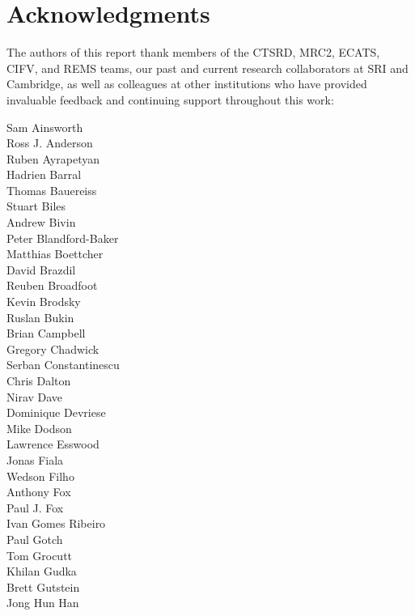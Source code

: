 \section*{Acknowledgments}

\vspace{-0.2cm}

The authors of this report thank members of the CTSRD, MRC2, ECATS,
CIFV, and REMS teams, our past and current research collaborators at SRI and
Cambridge, as well as colleagues at other institutions who have provided
invaluable feedback and continuing support throughout this work:

\medskip

\begin{small}
\noindent\begin{autogrid}{4}
Sam Ainsworth \\
Ross J. Anderson \\
Ruben Ayrapetyan \\
Hadrien Barral \\
Thomas Bauereiss \\
Stuart Biles \\
Andrew Bivin \\
Peter Blandford-Baker \\
Matthias Boettcher \\
David Brazdil \\
Reuben Broadfoot \\
Kevin Brodsky \\
Ruslan Bukin \\
Brian Campbell \\
Gregory Chadwick \\
Serban Constantinescu \\
Chris Dalton \\
Nirav Dave \\
Dominique Devriese \\
Mike Dodson \\
Lawrence Esswood \\
Jonas Fiala \\
Wedson Filho \\
Anthony Fox \\
Paul J. Fox \\
Ivan Gomes Ribeiro \\
Paul Gotch \\
Tom Grocutt \\
Khilan Gudka \\
Brett Gutstein \\
Jong Hun Han \\

\end{autogrid}
\end{small}
